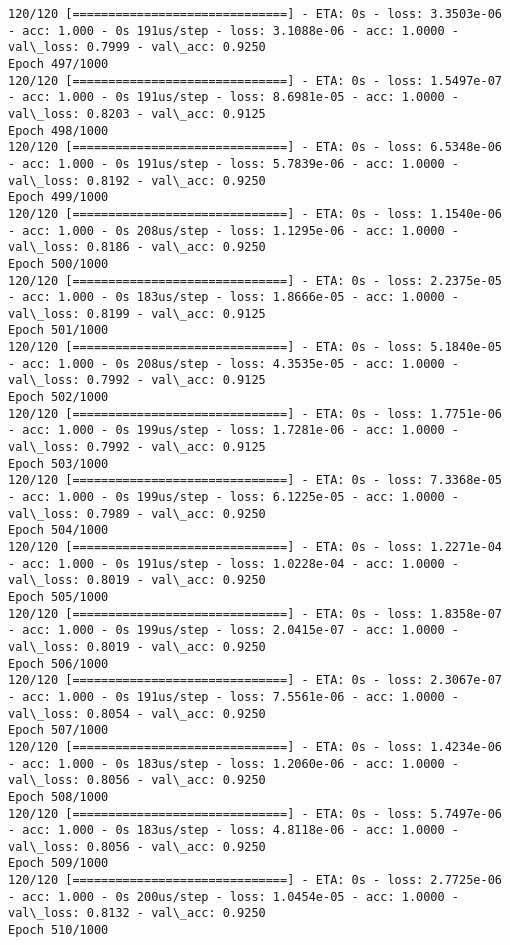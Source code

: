 \documentclass[11pt]{article}
\begin{document}
\begin{Verbatim}[commandchars=\\\{\}]
120/120 [==============================] - ETA: 0s - loss: 3.3503e-06 - acc: 1.000 - 0s 191us/step - loss: 3.1088e-06 - acc: 1.0000 - val\_loss: 0.7999 - val\_acc: 0.9250
Epoch 497/1000
120/120 [==============================] - ETA: 0s - loss: 1.5497e-07 - acc: 1.000 - 0s 191us/step - loss: 8.6981e-05 - acc: 1.0000 - val\_loss: 0.8203 - val\_acc: 0.9125
Epoch 498/1000
120/120 [==============================] - ETA: 0s - loss: 6.5348e-06 - acc: 1.000 - 0s 191us/step - loss: 5.7839e-06 - acc: 1.0000 - val\_loss: 0.8192 - val\_acc: 0.9250
Epoch 499/1000
120/120 [==============================] - ETA: 0s - loss: 1.1540e-06 - acc: 1.000 - 0s 208us/step - loss: 1.1295e-06 - acc: 1.0000 - val\_loss: 0.8186 - val\_acc: 0.9250
Epoch 500/1000
120/120 [==============================] - ETA: 0s - loss: 2.2375e-05 - acc: 1.000 - 0s 183us/step - loss: 1.8666e-05 - acc: 1.0000 - val\_loss: 0.8199 - val\_acc: 0.9125
Epoch 501/1000
120/120 [==============================] - ETA: 0s - loss: 5.1840e-05 - acc: 1.000 - 0s 208us/step - loss: 4.3535e-05 - acc: 1.0000 - val\_loss: 0.7992 - val\_acc: 0.9125
Epoch 502/1000
120/120 [==============================] - ETA: 0s - loss: 1.7751e-06 - acc: 1.000 - 0s 199us/step - loss: 1.7281e-06 - acc: 1.0000 - val\_loss: 0.7992 - val\_acc: 0.9125
Epoch 503/1000
120/120 [==============================] - ETA: 0s - loss: 7.3368e-05 - acc: 1.000 - 0s 199us/step - loss: 6.1225e-05 - acc: 1.0000 - val\_loss: 0.7989 - val\_acc: 0.9250
Epoch 504/1000
120/120 [==============================] - ETA: 0s - loss: 1.2271e-04 - acc: 1.000 - 0s 191us/step - loss: 1.0228e-04 - acc: 1.0000 - val\_loss: 0.8019 - val\_acc: 0.9250
Epoch 505/1000
120/120 [==============================] - ETA: 0s - loss: 1.8358e-07 - acc: 1.000 - 0s 199us/step - loss: 2.0415e-07 - acc: 1.0000 - val\_loss: 0.8019 - val\_acc: 0.9250
Epoch 506/1000
120/120 [==============================] - ETA: 0s - loss: 2.3067e-07 - acc: 1.000 - 0s 191us/step - loss: 7.5561e-06 - acc: 1.0000 - val\_loss: 0.8054 - val\_acc: 0.9250
Epoch 507/1000
120/120 [==============================] - ETA: 0s - loss: 1.4234e-06 - acc: 1.000 - 0s 183us/step - loss: 1.2060e-06 - acc: 1.0000 - val\_loss: 0.8056 - val\_acc: 0.9250
Epoch 508/1000
120/120 [==============================] - ETA: 0s - loss: 5.7497e-06 - acc: 1.000 - 0s 183us/step - loss: 4.8118e-06 - acc: 1.0000 - val\_loss: 0.8056 - val\_acc: 0.9250
Epoch 509/1000
120/120 [==============================] - ETA: 0s - loss: 2.7725e-06 - acc: 1.000 - 0s 200us/step - loss: 1.0454e-05 - acc: 1.0000 - val\_loss: 0.8132 - val\_acc: 0.9250
Epoch 510/1000

\end{Verbatim}
\end{document}
